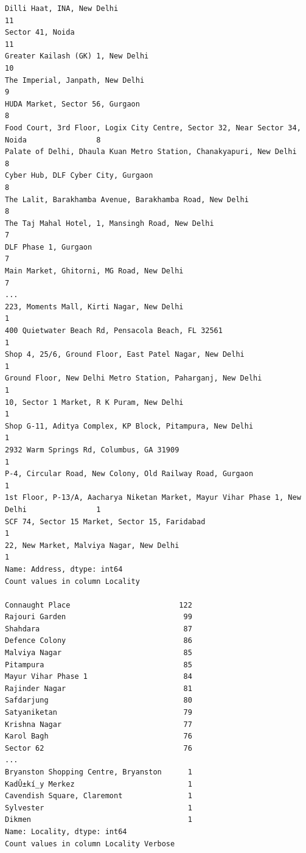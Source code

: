 \documentclass[11pt]{article} %
\begin{document}
\begin{lstlisting}
Dilli Haat, INA, New Delhi                                                               11
Sector 41, Noida                                                                         11
Greater Kailash (GK) 1, New Delhi                                                        10
The Imperial, Janpath, New Delhi                                                          9
HUDA Market, Sector 56, Gurgaon                                                           8
Food Court, 3rd Floor, Logix City Centre, Sector 32, Near Sector 34, Noida                8
Palate of Delhi, Dhaula Kuan Metro Station, Chanakyapuri, New Delhi                       8
Cyber Hub, DLF Cyber City, Gurgaon                                                        8
The Lalit, Barakhamba Avenue, Barakhamba Road, New Delhi                                  8
The Taj Mahal Hotel, 1, Mansingh Road, New Delhi                                          7
DLF Phase 1, Gurgaon                                                                      7
Main Market, Ghitorni, MG Road, New Delhi                                                 7
...
223, Moments Mall, Kirti Nagar, New Delhi                                                 1
400 Quietwater Beach Rd, Pensacola Beach, FL 32561                                        1
Shop 4, 25/6, Ground Floor, East Patel Nagar, New Delhi                                   1
Ground Floor, New Delhi Metro Station, Paharganj, New Delhi                               1
10, Sector 1 Market, R K Puram, New Delhi                                                 1
Shop G-11, Aditya Complex, KP Block, Pitampura, New Delhi                                 1
2932 Warm Springs Rd, Columbus, GA 31909                                                  1
P-4, Circular Road, New Colony, Old Railway Road, Gurgaon                                 1
1st Floor, P-13/A, Aacharya Niketan Market, Mayur Vihar Phase 1, New Delhi                1
SCF 74, Sector 15 Market, Sector 15, Faridabad                                            1
22, New Market, Malviya Nagar, New Delhi                                                  1
Name: Address, dtype: int64
Count values in column Locality 

Connaught Place                         122
Rajouri Garden                           99
Shahdara                                 87
Defence Colony                           86
Malviya Nagar                            85
Pitampura                                85
Mayur Vihar Phase 1                      84
Rajinder Nagar                           81
Safdarjung                               80
Satyaniketan                             79
Krishna Nagar                            77
Karol Bagh                               76
Sector 62                                76
...
Bryanston Shopping Centre, Bryanston      1
KadÛ±kí_y Merkez                          1
Cavendish Square, Claremont               1
Sylvester                                 1
Dikmen                                    1
Name: Locality, dtype: int64
Count values in column Locality Verbose 


\end{lstlisting}
\end{document}
